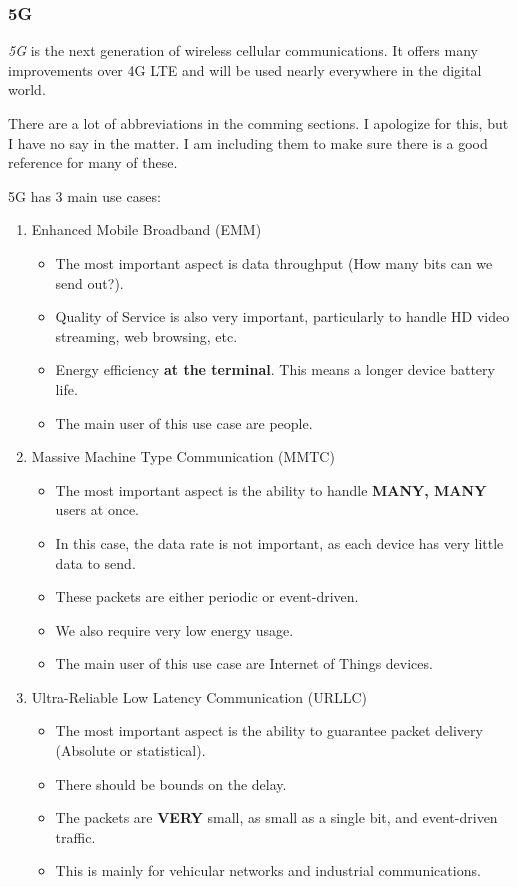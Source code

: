 \subsubsection{5G}\label{subsubsec:5G}
\begin{definition}[5G]\label{def:5G}
  \emph{5G} is the next generation of wireless cellular communications.
  It offers many improvements over 4G LTE and will be used nearly everywhere in the digital world.
\end{definition}

\begin{remark*}
  There are a lot of abbreviations in the comming sections.
  I apologize for this, but I have no say in the matter.
  I am including them to make sure there is a good reference for many of these.
\end{remark*}

5G has 3 main use cases:
\begin{enumerate}[noitemsep]
\item Enhanced Mobile Broadband (EMM)
  \begin{itemize}[noitemsep]
  \item The most important aspect is data throughput (How many bits can we send out?).
  \item Quality of Service is also very important, particularly to handle HD video streaming, web browsing, etc.
  \item Energy efficiency \textbf{at the terminal}. This means a longer device battery life.
  \item The main user of this use case are people.
  \end{itemize}
\item Massive Machine Type Communication (MMTC)
  \begin{itemize}[noitemsep]
  \item The most important aspect is the ability to handle \textbf{MANY, MANY} users at once.
  \item In this case, the data rate is not important, as each device has very little data to send.
  \item These packets are either periodic or event-driven.
  \item We also require very low energy usage.
  \item The main user of this use case are Internet of Things devices.
  \end{itemize}
\item Ultra-Reliable Low Latency Communication (URLLC)
  \begin{itemize}[noitemsep]
  \item The most important aspect is the ability to guarantee packet delivery (Absolute or statistical).
  \item There should be bounds on the delay.
  \item The packets are \textbf{VERY} small, as small as a single bit, and event-driven traffic.
  \item This is mainly for vehicular networks and industrial communications.
  \end{itemize}
\end{enumerate}

